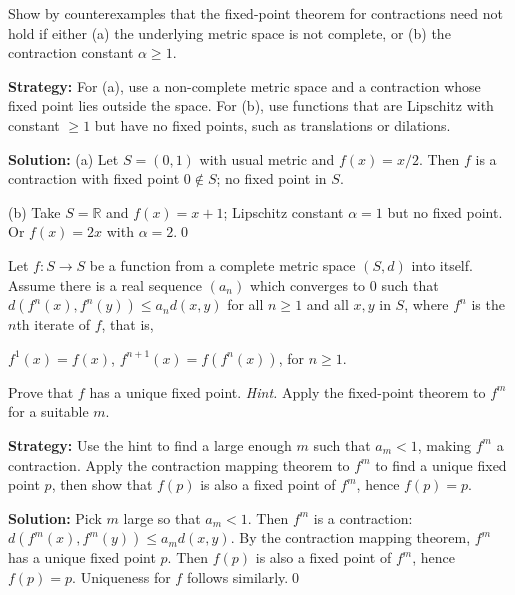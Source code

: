 \begin{problembox}
Show by counterexamples that the fixed-point theorem for contractions need not hold if either (a) the underlying metric space is not complete, or (b) the contraction constant $\alpha \ge 1$.
\end{problembox}

\noindent\textbf{Strategy:} For (a), use a non-complete metric space and a contraction whose fixed point lies outside the space. For (b), use functions that are Lipschitz with constant $\geq 1$ but have no fixed points, such as translations or dilations.

\bigskip\noindent\textbf{Solution:}
(a) Let $S=(0,1)$ with usual metric and $f(x)=x/2$. Then $f$ is a contraction with fixed point $0\notin S$; no fixed point in $S$.

(b) Take $S=\mathbb{R}$ and $f(x)=x+1$; Lipschitz constant $\alpha=1$ but no fixed point. Or $f(x)=2x$ with $\alpha=2$.\qed



\begin{problembox}
Let $f: S \to S$ be a function from a complete metric space $(S, d)$ into itself. Assume there is a real sequence $(a_n)$ which converges to $0$ such that $d(f^n(x), f^n(y)) \le a_n d(x, y)$ for all $n \ge 1$ and all $x, y$ in $S$, where $f^n$ is the $n$th iterate of $f$, that is, 

$f^1(x) = f(x)$, $f^{n+1}(x) = f(f^n(x))$, for $n \ge 1$. 

Prove that $f$ has a unique fixed point. \textit{Hint.} Apply the fixed-point theorem to $f^m$ for a suitable $m$.
\end{problembox}

\noindent\textbf{Strategy:} Use the hint to find a large enough $m$ such that $a_m < 1$, making $f^m$ a contraction. Apply the contraction mapping theorem to $f^m$ to find a unique fixed point $p$, then show that $f(p)$ is also a fixed point of $f^m$, hence $f(p) = p$.

\bigskip\noindent\textbf{Solution:}
Pick $m$ large so that $a_m<1$. Then $f^m$ is a contraction: $d(f^m(x),f^m(y))\le a_m d(x,y)$. By the contraction mapping theorem, $f^m$ has a unique fixed point $p$. Then $f(p)$ is also a fixed point of $f^m$, hence $f(p)=p$. Uniqueness for $f$ follows similarly.\qed



